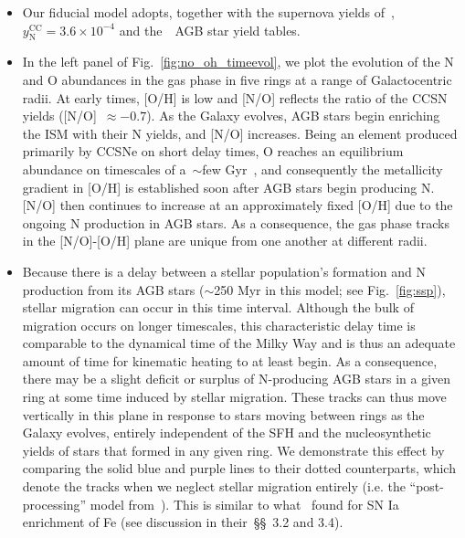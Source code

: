 \documentclass[ms.tex]{subfiles}
\begin{document}
\begin{itemize} 
	\item Our fiducial model adopts, together with the supernova yields 
	of~\citet[][see discussion in~\S~\ref{sec:methods}]{Johnson2021}, 
	$y_\text{N}^\text{CC} = 3.6\times10^{-4}$ and the~\cristallo~AGB star yield 
	tables. 

	\item In the left panel of Fig.~\ref{fig:no_oh_timeevol}, we plot the 
	evolution of the N and O abundances in the gas phase in five rings at 
	a range of Galactocentric radii. 
	At early times, [O/H] is low and [N/O] reflects the ratio of the CCSN 
	yields ([N/O]~$\approx -0.7$). 
	As the Galaxy evolves, AGB stars begin enriching the ISM with their N 
	yields, and [N/O] increases. 
	Being an element produced primarily by CCSNe on short delay times, O 
	reaches an equilibrium abundance on timescales of a~$\sim$few 
	Gyr~\citep{Weinberg2017}, and consequently the metallicity gradient in 
	[O/H] is established soon after AGB stars begin producing N. 
	[N/O] then continues to increase at an approximately fixed [O/H] due to the 
	ongoing N production in AGB stars. 
	As a consequence, the gas phase tracks in the [N/O]-[O/H] plane are unique 
	from one another at different radii. 

	\item Because there is a delay between a stellar population's formation and 
	N production from its AGB stars ($\sim$250 Myr in this model; see 
	Fig.~\ref{fig:ssp}), stellar migration can occur in this time interval. 
	Although the bulk of migration occurs on longer timescales, this 
	characteristic delay time is comparable to the dynamical time of the Milky 
	Way and is thus an adequate amount of time for kinematic heating to at 
	least begin. 
	As a consequence, there may be a slight deficit or surplus of N-producing 
	AGB stars in a given ring at some time induced by stellar migration. 
	These tracks can thus move vertically in this plane in response to stars 
	moving between rings as the Galaxy evolves, entirely independent of the 
	SFH and the nucleosynthetic yields of stars that formed in any given ring. 
	We demonstrate this effect by comparing the solid blue and purple lines to 
	their dotted counterparts, which denote the tracks when we neglect stellar 
	migration entirely (i.e. the ``post-processing'' model 
	from~\citealt{Johnson2021}). 
	This is similar to what~\citet{Johnson2021} found for SN Ia enrichment of 
	Fe (see discussion in their~\S\S~3.2 and 3.4). 


\end{itemize}
\end{document}
